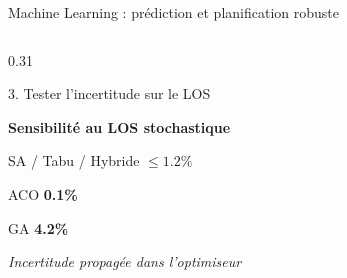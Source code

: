 \documentclass[aspectratio=169,11pt]{beamer}
\begin{document}
\begin{frame}{Machine Learning : prédiction et planification robuste}
\begin{columns}[T,onlytextwidth]
\begin{column}{0.31\textwidth}
\begin{block}{3. Tester l'incertitude sur le LOS}
				\vspace{0.30cm}
				
				\textbf{Sensibilité au LOS stochastique}
				
				\vspace{0.15cm}
				
				SA / Tabu / Hybride
				\hfill
				{\color{mcmPrimary}\textbf{$\leq 1.2\%$}}
				
				\vspace{0.10cm}
				
				ACO
				\hfill
				{\color{mcmPrimary}\textbf{0.1\%}}
				
				\vspace{0.10cm}
				
				GA
				\hfill
				{\color{mcmPrimary}\textbf{4.2\%}}
				
				\vspace{0.30cm}
				
				\textit{Incertitude propagée dans l'optimiseur}
				
			\end{block}
			
		\end{column}
		
	\end{columns}
	
\end{frame}
\end{document}
